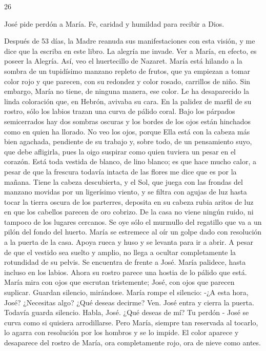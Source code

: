 \documentclass[12pt]{book} %
\begin{document}
26 
 
José pide perdón a María. Fe, caridad y humildad para recibir a Dios. 
 
Después de 53 días, la Madre reanuda sus manifestaciones con esta visión, y me dice que la escriba en este libro. La 
alegría me invade. Ver a María, en efecto, es poseer la Alegría. 
Así, veo el huertecillo de Nazaret. María está hilando a la sombra de un tupidísimo manzano repleto de frutos, que ya 
empiezan a tomar color rojo y que parecen, con su redondez y color rosado, carrillos de niño. 
Sin embargo, María no tiene, de ninguna manera, ese color. Le ha desaparecido la linda coloración que, en Hebrón, avivaba su cara. En la palidez de marfil de su rostro, sólo los labios trazan una curva de pálido coral. Bajo los párpados semicerrados hay dos sombras oscuras y los bordes de los ojos están hinchados como en quien ha llorado. No veo los ojos, porque Ella está con la cabeza más bien agachada, pendiente de su trabajo y, sobre todo, de un pensamiento suyo, que debe afligirla, pues la oigo suspirar como quien tuviera un pesar en el corazón. 
Está toda vestida de blanco, de lino blanco; es que hace mucho calor, a pesar de que la frescura todavía intacta de las 
flores me dice que es por la mañana. Tiene la cabeza descubierta, y el Sol, que juega con las frondas del manzano movidas por un ligerísimo viento, y se filtra con agujas de luz hasta tocar la tierra oscura de los parterres, deposita en su cabeza rubia aritos de luz en que los cabellos parecen de oro cobrizo. 
De la casa no viene ningún ruido, ni tampoco de los lugares cercanos. Se oye sólo el murmullo del regatillo que va a un 
pilón del fondo del huerto. 
María se estremece al oír un golpe dado con resolución a la puerta de la casa. Apoya rueca y huso y se levanta para ir a 
abrir. A pesar de que el vestido sea suelto y amplio, no llega a ocultar completamente la rotundidad de su pelvis. 
Se encuentra de frente a José. María palidece, hasta incluso en los labios. Ahora su rostro parece una hostia de lo pálido 
que está. María mira con ojos que escrutan tristemente; José, con ojos que parecen suplicar. Guardan silencio, mirándose. María rompe el silencio: 
-¿A esta hora, José? ¿Necesitas algo? ¿Qué deseas decirme? Ven. 
José entra y cierra la puerta. Todavía guarda silencio. 
Habla, José. ¿Qué deseas de mí? 
Tu perdón - José se curva como si quisiera arrodillarse. Pero María, siempre tan reservada al tocarlo, lo agarra con 
resolución por los hombros y se lo impide. 
El color aparece y desaparece del rostro de María, ora completamente rojo, ora de nieve como antes. 
\end{document}
